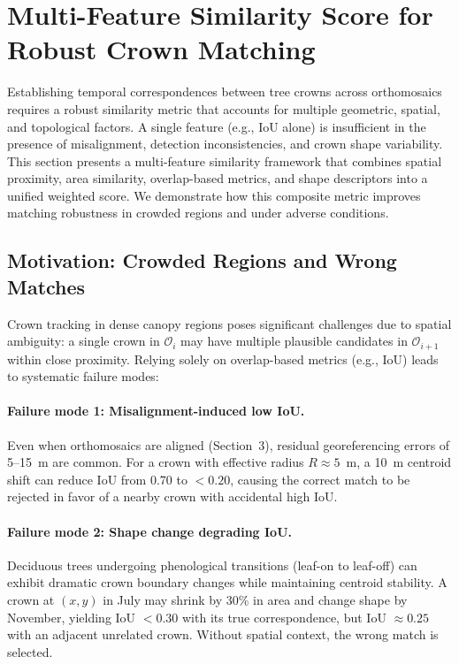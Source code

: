 \section{Multi-Feature Similarity Score for Robust Crown Matching}

Establishing temporal correspondences between tree crowns across orthomosaics requires a robust similarity metric that accounts for multiple geometric, spatial, and topological factors. A single feature (e.g., IoU alone) is insufficient in the presence of misalignment, detection inconsistencies, and crown shape variability. This section presents a multi-feature similarity framework that combines spatial proximity, area similarity, overlap-based metrics, and shape descriptors into a unified weighted score. We demonstrate how this composite metric improves matching robustness in crowded regions and under adverse conditions.

\subsection{Motivation: Crowded Regions and Wrong Matches}

Crown tracking in dense canopy regions poses significant challenges due to spatial ambiguity: a single crown in $\mathcal{O}_i$ may have multiple plausible candidates in $\mathcal{O}_{i+1}$ within close proximity. Relying solely on overlap-based metrics (e.g., IoU) leads to systematic failure modes:

\paragraph{Failure mode 1: Misalignment-induced low IoU.}
Even when orthomosaics are aligned (Section~3), residual georeferencing errors of 5--15~m are common. For a crown with effective radius $R \approx 5$~m, a 10~m centroid shift can reduce IoU from 0.70 to $<0.20$, causing the correct match to be rejected in favor of a nearby crown with accidental high IoU.

\paragraph{Failure mode 2: Shape change degrading IoU.}
Deciduous trees undergoing phenological transitions (leaf-on to leaf-off) can exhibit dramatic crown boundary changes while maintaining centroid stability. A crown at $(x,y)$ in July may shrink by 30\% in area and change shape by November, yielding IoU $<0.30$ with its true correspondence, but IoU $\approx 0.25$ with an adjacent unrelated crown. Without spatial context, the wrong match is selected.


